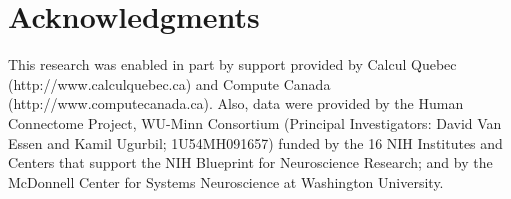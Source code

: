 \documentclass[a4paper,num-refs]{oup-contemporary}
\begin{document}



\section{Acknowledgments}

This research was enabled in part by support provided by 
Calcul Quebec (http://www.calculquebec.ca) and 
Compute Canada (http://www.computecanada.ca).
Also, data were provided by the Human Connectome Project, WU-Minn 
Consortium (Principal Investigators: David Van Essen and Kamil Ugurbil; 
1U54MH091657) funded by the 16 NIH Institutes and Centers that support 
the NIH Blueprint for Neuroscience Research; and by the McDonnell 
Center for Systems Neuroscience at Washington University.








\end{document}
